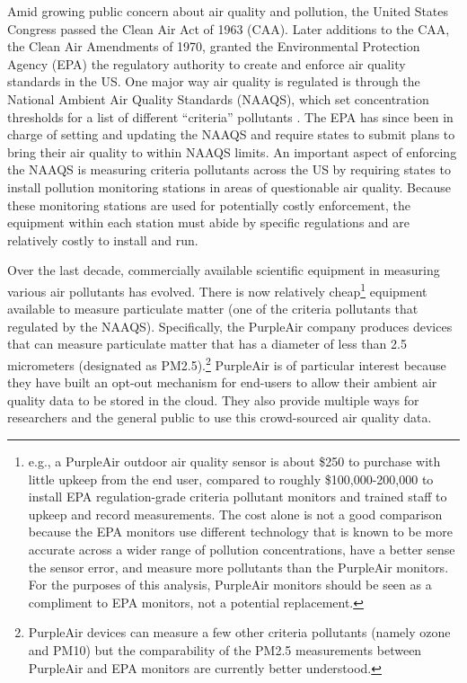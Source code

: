 Amid growing public concern about air quality and pollution, the United States Congress passed the Clean Air Act of 1963 (CAA). Later additions to the CAA, the Clean Air Amendments of 1970, granted the Environmental Protection Agency (EPA) the regulatory authority to create and enforce air quality standards in the US. One major way air quality is regulated is through the National Ambient Air Quality Standards (NAAQS), which set concentration thresholds for a list of different ``criteria'' pollutants
\citep{91stuscongressCleanAirAmendments1970}. The EPA has since been in charge of setting and updating the NAAQS and require states to submit plans to bring their air quality to within NAAQS limits. An important aspect of enforcing the NAAQS is measuring criteria pollutants across the US by requiring states to install pollution monitoring stations in areas of questionable air quality. Because these monitoring stations are used for potentially costly enforcement, the equipment within each station must abide by specific regulations and are relatively costly to install and run.

Over the last decade, commercially available scientific equipment in measuring various air pollutants has evolved. There is now relatively cheap\footnote{e.g., a PurpleAir outdoor air quality sensor is about \$250 to purchase with little upkeep from the end user, compared to roughly \$100,000-200,000 to install EPA regulation-grade criteria pollutant monitors and trained staff to upkeep and record measurements. The cost alone is not a good comparison because the EPA monitors use different technology that is known to be more accurate across a wider range of pollution concentrations, have a better sense the sensor error, and measure more pollutants than the PurpleAir monitors. For the purposes of this analysis, PurpleAir monitors should be seen as a compliment to EPA monitors, not a potential replacement.} equipment available to measure particulate matter (one of the criteria pollutants that regulated by the NAAQS). Specifically, the PurpleAir company produces devices that can measure particulate matter that has a diameter of less than 2.5 micrometers (designated as PM2.5).\footnote{PurpleAir devices can measure a few other criteria pollutants (namely ozone and PM10) but the comparability of the PM2.5 measurements between PurpleAir and EPA monitors are currently better understood.} PurpleAir is of particular interest because they have built an opt-out mechanism for end-users to allow their ambient air quality data to be stored in the cloud. They also provide multiple ways for researchers and the general public to use this crowd-sourced air quality data.

